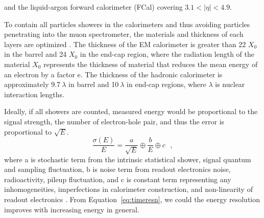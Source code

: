 and the liquid-argon forward calorimeter (FCal) covering $3.1 < |\eta| < 4.9$.
\par To contain all particles showers in the calorimeters and thus avoiding particles penetrating into the muon spectrometer, the materials and 
thickness of each layers are optimized \cite{Aad:1129811}. The thickness of the EM calorimeter is greater than 22 $X_0$ in the barrel and 24 $X_0$ in 
the end-cap region, where the radiation length of the material $X_0$ represents the thickness of material that reduces the mean energy of an electron 
by a factor e. The thickness of the hadronic calorimeter is approximately 9.7$~\lambda$ in barrel and 10$~\lambda$ in end-cap regions, where $\lambda$ is nuclear interaction lengths.
\par Ideally, if all showers are counted, measured energy would be proportional to the signal strength, the number of electron-hole pair, and thus the error is proportional to $\sqrt{E}$. 
\begin{equation}
\label{eq:timeresn}
\frac{\sigma(E)}{E} = \frac{a}{\sqrt{E}} \oplus \frac{b}{E} \oplus c \ \ \  ,
\end{equation}
where a is stochastic term from the intrinsic statistical shower, signal quantum and sampling fluctuation, b is noise term from readout electronics noise, radioactivity, pileup fluctuation, and c is constant term representing any inhomogeneities, imperfections in calorimeter construction, and non-linearity of readout electronics \cite{calorimetry}. From Equation~\ref{eq:timeresn}, we could the energy resolution improves with increasing energy in general.





